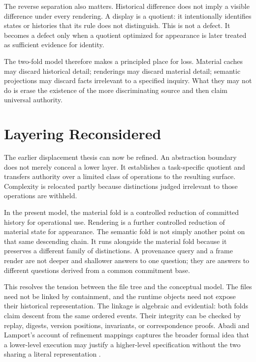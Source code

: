 \documentclass[11pt]{article}
\begin{document}
The reverse separation also matters. Historical difference does not imply a visible difference under every rendering. A display is a quotient: it intentionally identifies states or histories that its rule does not distinguish. This is not a defect. It becomes a defect only when a quotient optimized for appearance is later treated as sufficient evidence for identity.

The two-fold model therefore makes a principled place for loss. Material caches may discard historical detail; renderings may discard material detail; semantic projections may discard facts irrelevant to a specified inquiry. What they may not do is erase the existence of the more discriminating source and then claim universal authority.

\section{Layering Reconsidered}

The earlier displacement thesis can now be refined. An abstraction boundary does not merely conceal a lower layer. It establishes a task-specific quotient and transfers authority over a limited class of operations to the resulting surface. Complexity is relocated partly because distinctions judged irrelevant to those operations are withheld.

In the present model, the material fold is a controlled reduction of committed history for operational use. Rendering is a further controlled reduction of material state for appearance. The semantic fold is not simply another point on that same descending chain. It runs alongside the material fold because it preserves a different family of distinctions. A provenance query and a frame render are not deeper and shallower answers to one question; they are answers to different questions derived from a common commitment base.

This resolves the tension between the file tree and the conceptual model. The files need not be linked by containment, and the runtime objects need not expose their historical representation. The linkage is algebraic and evidential: both folds claim descent from the same ordered events. Their integrity can be checked by replay, digests, version positions, invariants, or correspondence proofs. Abadi and Lamport's account of refinement mappings captures the broader formal idea that a lower-level execution may justify a higher-level specification without the two sharing a literal representation \cite{abadi1991}.
\end{document}
